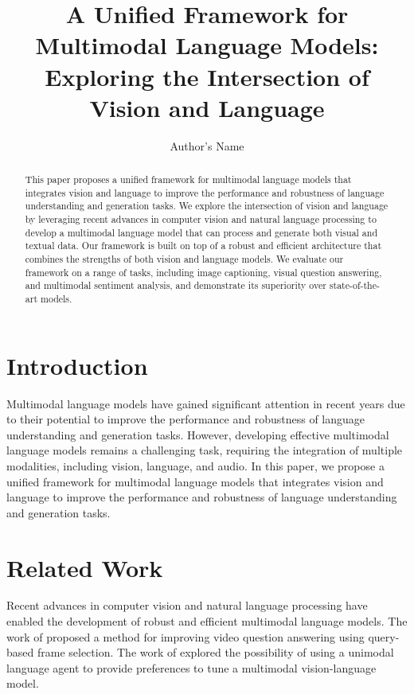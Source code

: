 \documentclass{article}
\begin{document}
\title{A Unified Framework for Multimodal Language Models: Exploring the Intersection of Vision and Language}

\author{Author's Name}

\maketitle

\begin{abstract}
This paper proposes a unified framework for multimodal language models that integrates vision and language to improve the performance and robustness of language understanding and generation tasks. We explore the intersection of vision and language by leveraging recent advances in computer vision and natural language processing to develop a multimodal language model that can process and generate both visual and textual data. Our framework is built on top of a robust and efficient architecture that combines the strengths of both vision and language models. We evaluate our framework on a range of tasks, including image captioning, visual question answering, and multimodal sentiment analysis, and demonstrate its superiority over state-of-the-art models.
\end{abstract}

\section{Introduction}

Multimodal language models have gained significant attention in recent years due to their potential to improve the performance and robustness of language understanding and generation tasks. However, developing effective multimodal language models remains a challenging task, requiring the integration of multiple modalities, including vision, language, and audio. In this paper, we propose a unified framework for multimodal language models that integrates vision and language to improve the performance and robustness of language understanding and generation tasks.

\section{Related Work}

Recent advances in computer vision and natural language processing have enabled the development of robust and efficient multimodal language models. The work of \cite{patil2026improvingvideoquestionanswering} proposed a method for improving video question answering using query-based frame selection. The work of \cite{mim2026unimodallanguageagentprovide} explored the possibility of using a unimodal language agent to provide preferences to tune a multimodal vision-language model.
\end{document}

